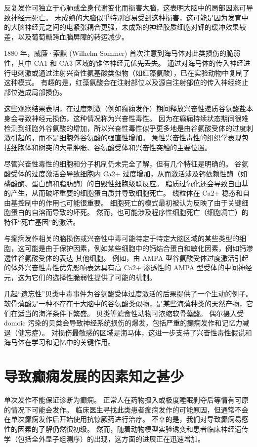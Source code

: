 反复发作可独立于心肺或全身代谢变化而损害大脑，这表明大脑中的局部因素可导致神经元死亡。
未成熟的大脑似乎特别容易受到这种损害，这可能是因为发育中的大脑神经元之间的电紧张耦合更强，未成熟的神经胶质细胞对钾的缓冲效果较差，以及葡萄糖跨血脑屏障的转运减少。


1880 年，威廉·索默 (Wilhelm Sommer) 首次注意到海马体对此类损伤的脆弱性，其中 CA1 和 CA3 区域的锥体神经元优先丢失。
通过对海马体的传入神经进行电刺激或通过注射兴奋性氨基酸类似物（如红藻氨酸），已在实验动物中复制了这种模式。
有趣的是，红藻氨酸会在注射部位以及源自注射部位的传入神经终止部位造成局部损伤。


这些观察结果表明，在过度刺激（例如癫痫发作）期间释放兴奋性递质谷氨酸盐本身会导致神经元损伤，这种情况称为兴奋性毒性。
因为在癫痫持续状态期间很难检测到细胞外谷氨酸的增加，所以兴奋性毒性似乎更多地是由谷氨酸受体的过度刺激引起的，而不是细胞外谷氨酸的强直性增加。
急性兴奋性毒性的组织学表现包括细胞体和树突的大量肿胀、谷氨酸受体和兴奋性突触的主要位置。


尽管兴奋性毒性的细胞和分子机制仍未完全了解，但有几个特征是明确的。
谷氨酸受体的过度激活会导致细胞内 Ca2+ 过度增加，从而激活涉及钙依赖性酶（如磷酸酶、蛋白酶和脂肪酶）的自毁性细胞级联反应。
脂质过氧化还会导致自由基的产生，从而破坏重要的细胞蛋白质并导致细胞死亡。
线粒体在 Ca2+ 稳态和自由基控制中的作用也可能很重要。 细胞死亡的模式最初被认为反映了由于关键细胞蛋白的自溶而导致的坏死。
然而，也可能涉及程序性细胞死亡（细胞凋亡）的特征“死亡基因”的激活。


与癫痫发作相关的脑损伤或兴奋性中毒可能特定于特定大脑区域的某些类型的细胞，这可能是由于保护因素，例如某些细胞中的钙结合蛋白和敏化因素，例如钙渗透性谷氨酸受体的表达 其他细胞。
例如，由 AMPA 型谷氨酸受体过度激活引起的体外兴奋性毒性优先影响表达具有高 Ca2+ 渗透性的 AMPA 型受体的中间神经元，这为它们的选择性脆弱性提供了可能的机制。


几起“遗忘性”贝类中毒事件为谷氨酸受体过度激活的后果提供了一个生动的例子。
软骨藻酸是一种不存在于大脑中的谷氨酸类似物，是某些海藻种类的天然产物，它们在适当的海洋条件下繁盛。
贝类等滤食性动物可浓缩软骨藻酸。
偶尔摄入受 domoic 污染的贝类会导致神经系统损伤的爆发，包括严重的癫痫发作和记忆力减退（健忘症）。
对损伤最敏感的区域是海马体，这进一步支持了兴奋性毒性假说和海马体在学习和记忆中的关键作用。



\section{导致癫痫发展的因素知之甚少}

单次发作不能保证诊断为癫痫。
正常人在药物摄入或极度睡眠剥夺后等情有可原的情况下可能会发作。
临床医生寻找此类患者癫痫发作的可能原因，但通常不会在单次癫痫发作后开始使用抗惊厥药进行治疗。
不幸的是，我们对导致癫痫易感性的因素的了解仍然很初级。
然而，随着动物模型实验诱变和患者临床神经遗传学（包括全外显子组测序）的出现，这方面的进展正在迅速增加。


